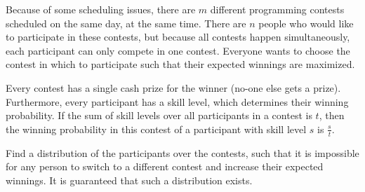 







Because of some scheduling issues, there are $m$ different programming contests
scheduled on the same day, at the same time. There are $n$ people who would like
to participate in these contests, but because all contests happen
simultaneously, each participant can only compete in one contest. Everyone wants
to choose the contest in which to participate such that their expected winnings
are maximized.

Every contest has a single cash prize for the winner (no-one else gets a prize).
Furthermore, every participant has a skill level, which determines their winning
probability. If the sum of skill levels over all participants in a contest is
$t$, then the winning probability in this contest of a participant with skill
level $s$ is $\frac{s}{t}$.

Find a distribution of the participants over the contests, such that it is
impossible for any person to switch to a different contest and increase their
expected winnings. It is guaranteed that such a distribution exists.

